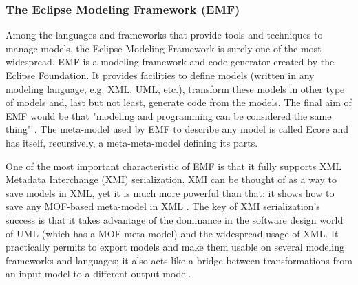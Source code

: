 \subsubsection{The Eclipse Modeling Framework (EMF)}
\label{EMF}
Among the languages and frameworks that provide tools and techniques to manage models, the Eclipse Modeling Framework is surely one of the most widespread. 
EMF is a modeling framework and code generator created by the Eclipse Foundation. It provides facilities to define models (written in any modeling language, e.g. XML, UML, etc.), transform these models in other type of models and, last but not least, generate code from the models. The final aim of EMF would be that "modeling and programming can be considered the same thing" \cite{Steinberg2009EMF}. 
The meta-model used by EMF to describe any model is called Ecore and has itself, recursively, a meta-meta-model defining its parts. 

One of the most important characteristic of EMF is that it fully supports XML Metadata Interchange (XMI) serialization. XMI can be thought of as a way to save models in XML, yet it is much more powerful than that: it shows how to save any MOF-based meta-model in XML \cite{XMIandMOF}. The key of XMI serialization's success is that it takes advantage of the dominance in the software design world of UML (which has a MOF meta-model) and the widespread usage of XML. It practically permits to export models and make them usable on several modeling frameworks and languages; it also acts like a bridge between transformations from an input model to a different output model.




   

% 


% 


 
